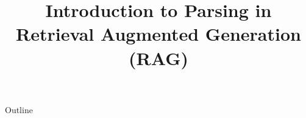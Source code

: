 \documentclass[xcolor=dvipsnames,compress,t,pdf,9pt]{beamer}
\title[\insertframenumber /\inserttotalframenumber]{Introduction to Parsing in Retrieval Augmented Generation (RAG)}
\begin{document}
	\begin{frame}
	\titlepage
	\end{frame}
	
	\begin{frame}{Outline}
	    \tableofcontents
	\end{frame}

%	
	
	
\end{document}
